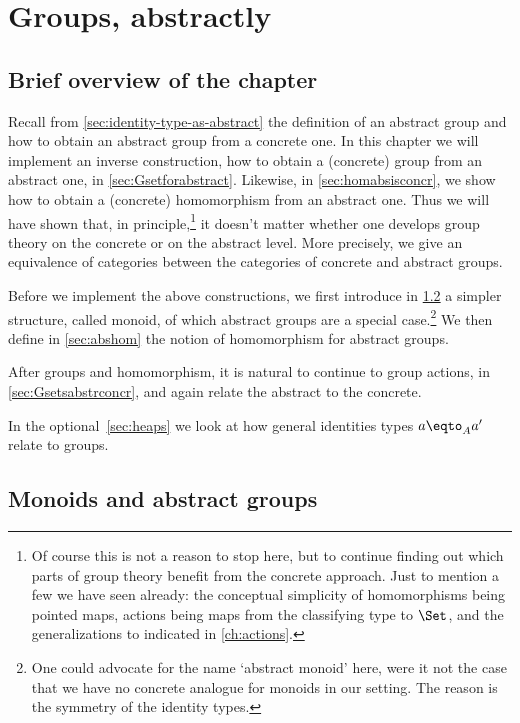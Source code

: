 \chapter{Groups, abstractly}
\label{ch:absgroup}

\section{Brief overview of the chapter}
Recall from \cref{sec:identity-type-as-abstract} the definition of an
abstract group and how to obtain an abstract group from a concrete one.
In this chapter we will
implement an inverse construction, how to obtain a (concrete) group from
an abstract one, in \cref{sec:Gsetforabstract}. Likewise, in \cref{sec:homabsisconcr},
we show how to obtain a (concrete) homomorphism from an abstract one.
Thus we will have shown that, in principle,\footnote{%
  Of course this is not a reason to stop here, but to continue
  finding out which parts of group theory benefit from the concrete approach.
  Just to mention a few we have seen already:
  the conceptual simplicity of homomorphisms being pointed maps,
  actions being maps from the classifying type to $\Set$,
and the generalizations to \inftygps indicated in \cref{ch:actions}.}
it doesn't matter whether
one develops group theory on the concrete or on the abstract level.
More precisely, we give an equivalence of categories between the categories of concrete
and abstract groups.

Before we implement the above constructions,
we first introduce in \cref{sec:monoids} a simpler structure, 
called monoid, of which abstract groups are a special case.\footnote{%
One could advocate for the name `abstract monoid' here, were it not the
case that we have no concrete analogue for monoids in our setting.
The reason is the symmetry of the identity types.}
We then define in \cref{sec:abshom} the notion of homomorphism for
abstract groups.

After groups and homomorphism, it is natural to continue to group actions,
in \cref{sec:Gsetsabstrconcr}, and again relate the abstract to the concrete.

 In the optional~\cref{sec:heaps} we look at how general
identities types $a \eqto_A a'$ relate to groups.

\section{Monoids and abstract groups}
\label{sec:monoids}

